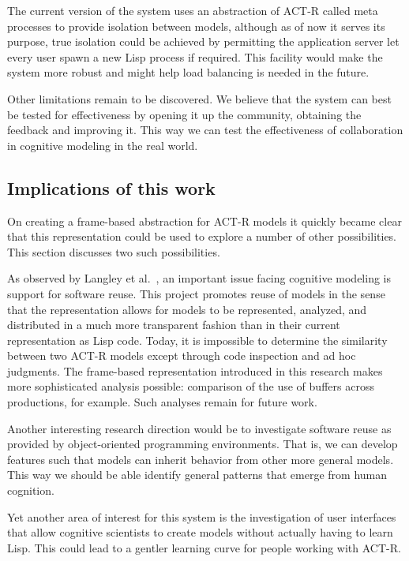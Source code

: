
The current version of the system uses an abstraction of ACT-R called
meta processes to provide isolation between models, although as of now
it serves its purpose, true isolation could be achieved by permitting
the application server let every user spawn a new Lisp process if
required. This facility would make the system more robust and might
help load balancing is needed in the future.

Other limitations remain to be discovered.  We believe that the system
can best be tested for effectiveness by opening it up the community,
obtaining the feedback and improving it. This way we can test the
effectiveness of collaboration in cognitive modeling in the real
world.

\subsection{Implications of this work}

On creating a frame-based abstraction for ACT-R models it quickly
became clear that this representation could be used to explore a
number of other possibilities. This section discusses two such
possibilities.

As observed by Langley et al.~\cite{citeulike:4182324}, an important
issue facing cognitive modeling is support for software reuse. This
project promotes reuse of models in the sense that the representation
allows for models to be represented, analyzed, and distributed in a
much more transparent fashion than in their current representation as
Lisp code.  Today, it is impossible to determine the similarity
between two ACT-R models except through code inspection and ad hoc
judgments.  The frame-based representation introduced in this research
makes more sophisticated analysis possible: comparison of the use of
buffers across productions, for example.  Such analyses remain for
future work.

Another interesting research direction would be to investigate software
reuse as provided by object-oriented programming environments.  That
is, we can develop features such that models can inherit behavior from
other more general models.  This way we should be able identify
general patterns that emerge from human cognition.

Yet another area of interest for this system is the investigation of
user interfaces that allow cognitive scientists to create models
without actually having to learn Lisp. This could lead to a gentler
learning curve for people working with ACT-R.

